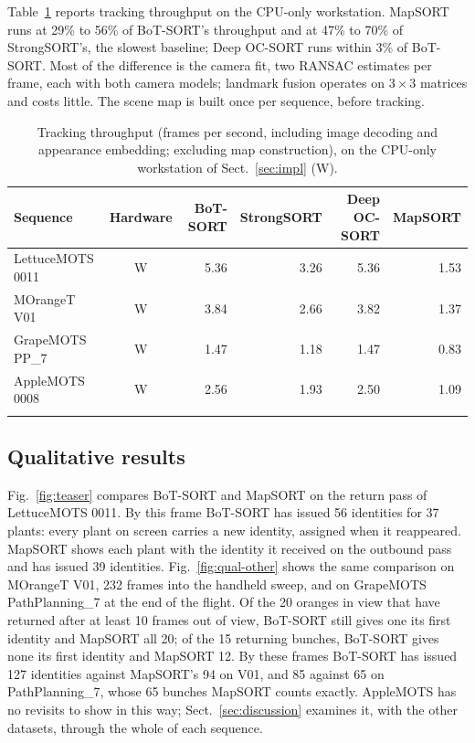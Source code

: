 \documentclass[pdflatex,sn-basic]{sn-jnl}%
\theoremstyle{thmstyleone}%
\begin{document}
Table~\ref{tab:runtime} reports tracking throughput on the CPU-only workstation. MapSORT runs at 29\% to 56\% of BoT-SORT's throughput and at 47\% to 70\% of StrongSORT's, the slowest baseline; Deep OC-SORT runs within 3\% of BoT-SORT. Most of the difference is the camera fit, two RANSAC estimates per frame, each with both camera models; landmark fusion operates on $3\times3$ matrices and costs little. The scene map is built once per sequence, before tracking.

\begin{table}[t]
\caption{Tracking throughput (frames per second, including image decoding and appearance embedding; excluding map construction), on the CPU-only workstation of Sect.~\ref{sec:impl} (W).}\label{tab:runtime}
\footnotesize
\begin{tabular*}{\textwidth}{@{\extracolsep\fill}lcrrrr@{}}
\toprule
Sequence & Hardware & BoT-SORT & StrongSORT & Deep OC-SORT & MapSORT \\
\midrule
LettuceMOTS 0011 & W & 5.36 & 3.26 & 5.36 & 1.53 \\
MOrangeT V01 & W & 3.84 & 2.66 & 3.82 & 1.37 \\
GrapeMOTS PP\_7 & W & 1.47 & 1.18 & 1.47 & 0.83 \\
AppleMOTS 0008 & W & 2.56 & 1.93 & 2.50 & 1.09 \\
\botrule
\end{tabular*}
\end{table}

\subsection{Qualitative results}\label{sec:res-qual}

Fig.~\ref{fig:teaser} compares BoT-SORT and MapSORT on the return pass of LettuceMOTS 0011. By this frame BoT-SORT has issued 56 identities for 37 plants: every plant on screen carries a new identity, assigned when it reappeared. MapSORT shows each plant with the identity it received on the outbound pass and has issued 39 identities. Fig.~\ref{fig:qual-other} shows the same comparison on MOrangeT V01, 232 frames into the handheld sweep, and on GrapeMOTS PathPlanning\_7 at the end of the flight. Of the 20 oranges in view that have returned after at least 10 frames out of view, BoT-SORT still gives one its first identity and MapSORT all 20; of the 15 returning bunches, BoT-SORT gives none its first identity and MapSORT 12. By these frames BoT-SORT has issued 127 identities against MapSORT's 94 on V01, and 85 against 65 on PathPlanning\_7, whose 65 bunches MapSORT counts exactly. AppleMOTS has no revisits to show in this way; Sect.~\ref{sec:discussion} examines it, with the other datasets, through the whole of each sequence.
\end{document}

